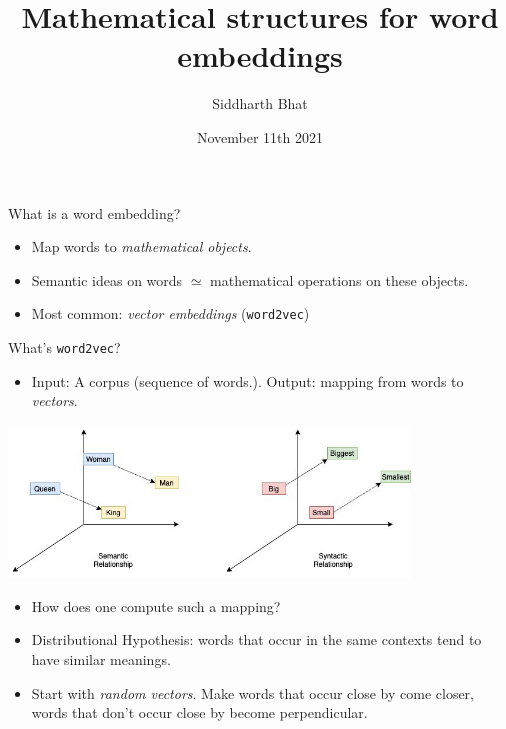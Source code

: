 \documentclass[8pt]{beamer}
\author{Siddharth Bhat}
\date{November 11th 2021}
\institute{IIIT Hyderabad}
\title{Mathematical structures for word embeddings}
\begin{document}
\maketitle

\begin{frame}[label=sec-1]{What is a word embedding?}
  \pause
\begin{itemize}
  \item Map words to \emph{mathematical objects}.  \pause
  \item Semantic ideas on words $\simeq$ mathematical operations on these objects. \pause
  \item Most common: \emph{vector embeddings} (\texttt{word2vec}) \pause
\end{itemize}
\end{frame}


\begin{frame}{What's \texttt{word2vec}?}
\begin{itemize}
    \item Input: A corpus (sequence of words.). Output: mapping from words to \emph{vectors}.\pause
\end{itemize}
\includegraphics[width=0.8\textwidth]{w2v-linear-relationship.jpeg} \pause
\begin{itemize}
    \item How does one compute such a mapping?  \pause
    \item Distributional Hypothesis: words that occur in the same contexts tend to have similar meanings.\pause
    \item Start with \emph{random vectors}. Make words that occur close by come closer, words that don't occur close by become perpendicular.\pause
\end{itemize}
\end{frame}
\end{document}
